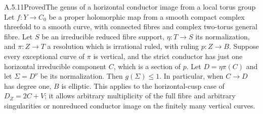 \begin{statement}{A.5.11}{Proved}{The genus of a horizontal conductor image from a local torus group}
Let $f:Y\to C_0$ be a proper holomorphic map from a smooth
compact complex threefold to a smooth curve, with connected
fibres and complex two-torus general fibre. Let $S$ be an
irreducible reduced fibre support, $\eta:T\to S$ its
normalization, and $\pi:Z\to T$ a resolution which is
irrational ruled, with ruling $p:Z\to B$.
Suppose every exceptional curve of $\pi$ is vertical, and
the strict conductor has just one horizontal irreducible
component $C$, which is a section of $p$.
Let $D=\eta\pi(C)$ and let $\Sigma=D^\nu$ be its normalization.
Then $g(\Sigma)\le1$.
In particular, when $C\to D$ has degree one, $B$ is elliptic.
This applies to the horizontal-cusp case of $D_Z=2C+V$;
it allows arbitrary multiplicity of the full fibre and
arbitrary singularities or nonreduced conductor image on
the finitely many vertical curves.
\end{statement}

